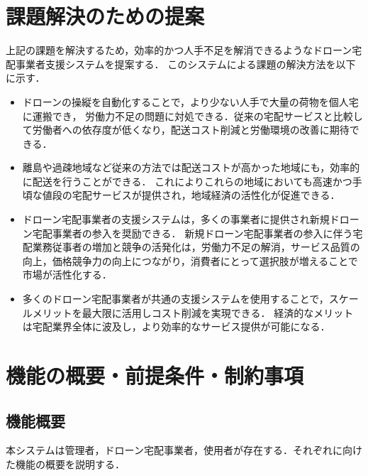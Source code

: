 \documentclass[a4paper, titlepage]{jsarticle}
\begin{document}
\section{課題解決のための提案}
上記の課題を解決するため，効率的かつ人手不足を解消できるようなドローン宅配事業者支援システムを提案する．
このシステムによる課題の解決方法を以下に示す．
\begin{itemize}
    \item ドローンの操縦を自動化することで，より少ない人手で大量の荷物を個人宅に運搬でき，
    労働力不足の問題に対処できる．従来の宅配サービスと比較して労働者への依存度が低くなり，配送コスト削減と労働環境の改善に期待できる．

    \item 離島や過疎地域など従来の方法では配送コストが高かった地域にも，効率的に配送を行うことができる．
    これによりこれらの地域においても高速かつ手頃な値段の宅配サービスが提供され，地域経済の活性化が促進できる．

    \item ドローン宅配事業者の支援システムは，多くの事業者に提供され新規ドローン宅配事業者の参入を奨励できる．
    新規ドローン宅配事業者の参入に伴う宅配業務従事者の増加と競争の活発化は，労働力不足の解消，サービス品質の向上，価格競争力の向上につながり，消費者にとって選択肢が増えることで市場が活性化する．

    \item 多くのドローン宅配事業者が共通の支援システムを使用することで，スケールメリットを最大限に活用しコスト削減を実現できる．
    経済的なメリットは宅配業界全体に波及し，より効率的なサービス提供が可能になる．


\end{itemize}

\section{機能の概要・前提条件・制約事項}
\subsection{機能概要}
本システムは管理者，ドローン宅配事業者，使用者が存在する．それぞれに向けた機能の概要を説明する．
\end{document}
